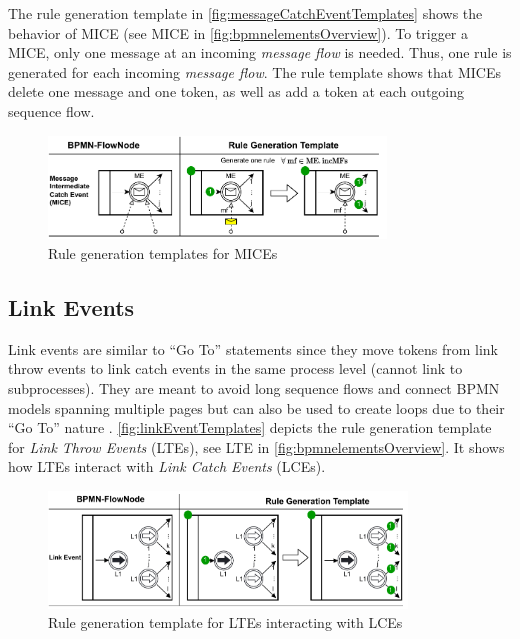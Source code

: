 \documentclass{lmcs} %
\begin{document}
The rule generation template in \autoref{fig:messageCatchEventTemplates} shows the behavior of MICE (see \textsf{MICE} in \autoref{fig:bpmnelementsOverview}).
To trigger a MICE, only one message at an incoming \textit{message flow} is needed.
Thus, one rule is generated for each incoming \textit{message flow}.
The rule template shows that MICEs delete one message and one token, as well as add a token at each outgoing sequence flow.

\begin{figure}[ht]
    \centering
    \includegraphics[width=0.8\textwidth]{images/mice_template.pdf}
    \caption{Rule generation templates for MICEs}
    \label{fig:messageCatchEventTemplates}
\end{figure}


\subsection{Link Events} \label{subsec:signalEvents}
Link events are similar to \enquote{Go To} statements since they move tokens from link throw events to link catch events in the same process level (cannot link to subprocesses).
They are meant to avoid long sequence flows and connect BPMN models spanning multiple pages but can also be used to create loops due to their \enquote{Go To} nature \cite{objectmanagementgroupBusinessProcessModel2013}.
\autoref{fig:linkEventTemplates} depicts the rule generation template for \textit{Link Throw Events} (LTEs), see \textsf{LTE} in \autoref{fig:bpmnelementsOverview}.
It shows how LTEs interact with \textit{Link Catch Events} (LCEs).

\begin{figure}[ht]
    \centering
    \includegraphics[width=0.85\textwidth]{images/linkEvent_template.pdf}
    \caption{Rule generation template for LTEs interacting with LCEs}
    \label{fig:linkEventTemplates}
\end{figure}
\end{document}
